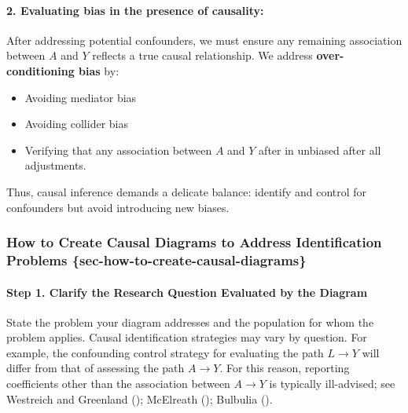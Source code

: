 \documentclass[
  singlecolumn]{article}
\let\oldparagraph\paragraph
\renewcommand{\paragraph}[1]{\oldparagraph{#1}\mbox{}}
\providecommand{\tightlist}{%
  \setlength{\itemsep}{0pt}\setlength{\parskip}{0pt}}\usepackage{longtable,booktabs,array}
\begin{document}
\paragraph{\texorpdfstring{2. \textbf{Evaluating bias in the presence of
causality:}}{2. Evaluating bias in the presence of causality:}}\label{evaluating-bias-in-the-presence-of-causality}

After addressing potential confounders, we must ensure any remaining
association between \(A\) and \(Y\) reflects a true causal relationship.
We address \textbf{over-conditioning bias} by:

\begin{itemize}
\tightlist
\item
  Avoiding mediator bias
\item
  Avoiding collider bias
\item
  Verifying that any association between \(A\) and \(Y\) after in
  unbiased after all adjustments.
\end{itemize}

Thus, causal inference demands a delicate balance: identify and control
for confounders but avoid introducing new biases.

\subsubsection{How to Create Causal Diagrams to Address Identification
Problems
\{sec-how-to-create-causal-diagrams\}}\label{how-to-create-causal-diagrams-to-address-identification-problems-sec-how-to-create-causal-diagrams}

\paragraph{Step 1. Clarify the Research Question Evaluated by the
Diagram}\label{step-1.-clarify-the-research-question-evaluated-by-the-diagram}

State the problem your diagram addresses and the population for whom the
problem applies. Causal identification strategies may vary by question.
For example, the confounding control strategy for evaluating the path
\(L\to Y\) will differ from that of assessing the path \(A\to Y\). For
this reason, reporting coefficients other than the association between
\(A \to Y\) is typically ill-advised; see Westreich and Greenland
(); McElreath
(); Bulbulia
().
\end{document}
